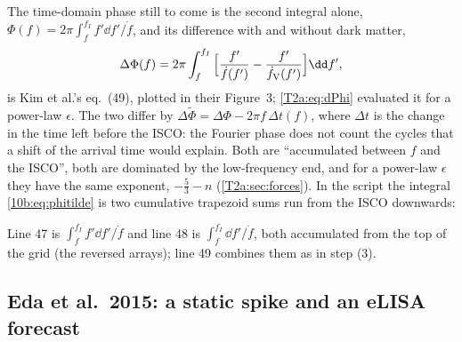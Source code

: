 The time-domain phase still to come is the second integral alone, $\Phi(f)=2\pi\int_f^{f_I}f'\dd f'/\dot f$, and its
difference with and without dark matter,
\begin{equation}
  \Delta\Phi(f)=2\pi\int_f^{f_I}\Big[\frac{f'}{\dot f(f')}-\frac{f'}{\dot f_{\rm V}(f')}\Big]\dd f',
  \label{10b:eq:kim49}
\end{equation}
is Kim et al.'s eq.~(49), plotted in their Figure~3; \cref{T2a:eq:dPhi} evaluated it for a power-law $\epsilon$. The
two differ by $\Delta\tilde\Phi=\Delta\Phi-2\pi f\,\Delta t(f)$, where $\Delta t$ is the change in the time left before the
ISCO: the Fourier phase does not count the cycles that a shift of the arrival time would explain. Both are
``accumulated between $f$ and the ISCO'', both are dominated by the low-frequency end, and for a power-law $\epsilon$
they have the same exponent, $-\tfrac53-n$ (\cref{T2a:sec:forces}). In the script  the integral
\eqref{10b:eq:phitilde} is two cumulative trapezoid sums run from the ISCO downwards:


\noindent Line 47 is $\int_f^{f_I}f'\dd f'/\dot f$ and line 48 is $\int_f^{f_I}\dd f'/\dot f$, both accumulated from the
top of the grid (the reversed arrays); line 49 combines them as in step (3).

\subsection{Eda et al.\ 2015: a static spike and an eLISA forecast}
\label{10b:sec:eda}

